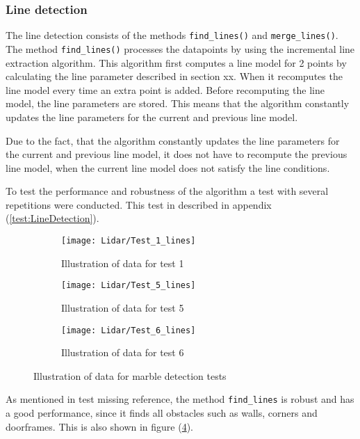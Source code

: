 \documentclass[../Head/Main.tex]{subfiles}
\begin{document}
\subsubsection{Line detection}
The line detection consists of the methods \texttt{find\_lines()} and \texttt{merge\_lines()}.\\
The method \texttt{find\_lines()} processes the datapoints by using the incremental line extraction algorithm. This algorithm first computes a line model for 2 points by calculating the line parameter described in section xx. When it recomputes the line model every time an extra point is added. Before recomputing the line model, the line parameters are stored. This means that the algorithm constantly updates the line parameters for the current and previous line model.\par
Due to the fact, that the algorithm constantly updates the line parameters for the current and previous line model, it does not have to recompute the previous line model, when the current line model does not satisfy the line conditions. \par
To test the performance and robustness of the algorithm a  test with several repetitions were conducted. This test in described in appendix (\ref{test:LineDetection}).
\begin{figure}[H]
  \begin{subfigure}[b]{0.3\textwidth}
  	\centering
    \texttt{[image: Lidar/Test\_1\_lines]}
    \caption{Illustration of data for test 1}
    \label{fig:LineTest1}
  \end{subfigure}
  \hfill
  \begin{subfigure}[b]{0.3\textwidth}
  	\centering
    \texttt{[image: Lidar/Test\_5\_lines]}
    \caption{Illustration of data for test 5}
    \label{fig:LineTest5}
  \end{subfigure}
  \hfill
  \begin{subfigure}[b]{0.3\textwidth}
    \centering
    \texttt{[image: Lidar/Test\_6\_lines]}
    \caption{Illustration of data for test 6}
    \label{fig:LineTest6}
  \end{subfigure}
  \caption{Illustration of data for marble detection tests}
  \label{fig:LineTests}
\end{figure}
As mentioned in test {\color{red} missing reference}, the method \texttt{find\_lines} is robust and has a good performance, since it finds all obstacles such as walls, corners and doorframes. This is also shown in figure (\ref{fig:LineTests}).\par
\end{document}
